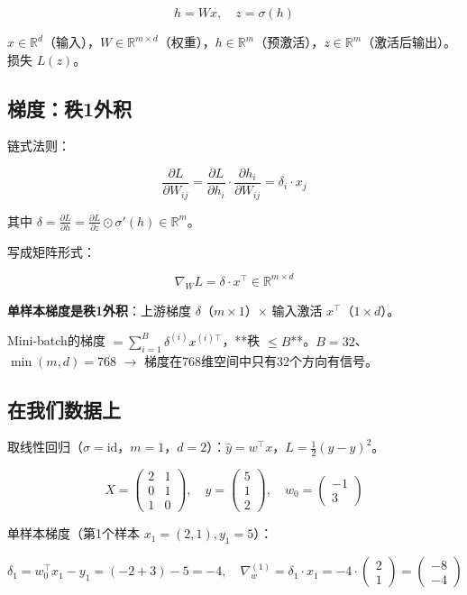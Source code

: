 \documentclass[12pt,a4paper]{article}
\begin{document}
\[h = Wx, \quad z = \sigma(h)\]

$x \in \mathbb{R}^d$（输入），$W \in \mathbb{R}^{m \times d}$（权重），$h \in \mathbb{R}^m$（预激活），$z \in \mathbb{R}^m$（激活后输出）。损失 $L(z)$。


\subsection{梯度：秩1外积}

链式法则：


\[\frac{\partial L}{\partial W_{ij}} = \frac{\partial L}{\partial h_i} \cdot \frac{\partial h_i}{\partial W_{ij}} = \delta_i \cdot x_j\]

其中 $\delta = \frac{\partial L}{\partial h} = \frac{\partial L}{\partial z} \odot \sigma'(h) \in \mathbb{R}^m$。

写成矩阵形式：


\[\boxed{\nabla_W L = \delta \cdot x^\top \in \mathbb{R}^{m \times d}}\]

\textbf{单样本梯度是秩1外积}：上游梯度 $\delta$（$m \times 1$）$\times$ 输入激活 $x^\top$（$1 \times d$）。

Mini-batch的梯度 $= \sum_{i=1}^B \delta^{(i)} x^{(i)\top}$，**秩 $\le B$**。$B = 32$、$\min(m,d) = 768$ $\to$ 梯度在768维空间中只有32个方向有信号。


\subsection{在我们数据上}

取线性回归（$\sigma = \text{id}$，$m = 1$，$d = 2$）：$\hat{y} = w^\top x$，$L = \frac{1}{2}(\hat{y} - y)^2$。


\[X = \begin{pmatrix}2&1\\0&1\\1&0\end{pmatrix}, \quad y = \begin{pmatrix}5\\1\\2\end{pmatrix}, \quad w_0 = \begin{pmatrix}-1\\3\end{pmatrix}\]

单样本梯度（第1个样本 $x_1 = (2,1), y_1 = 5$）：


\[\delta_1 = w_0^\top x_1 - y_1 = (-2+3) - 5 = -4, \quad \nabla_w^{(1)} = \delta_1 \cdot x_1 = -4 \cdot \begin{pmatrix}2\\1\end{pmatrix} = \begin{pmatrix}-8\\-4\end{pmatrix}\]
\end{document}
